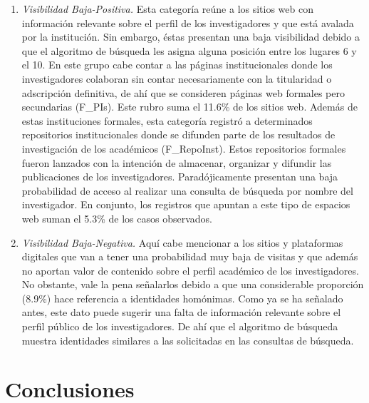 \documentclass[
  spanish,
  11pt,
  a4paper,
]{scrbook}
\begin{document}
\begin{enumerate}
  perfil académico del investigador, alojada en páginas web con
  determinada reputación o seriedad, tiende a restar relevancia para el
  algoritmo de búsqueda, de ahí que la consulta con el nombre propio del
  investigador arroje resultados homónimos. De igual manera, la
  singularidad o popularidad de los apellidos (por ejemplo, un Hernández
  López \emph{versus} un Cetto Kramis) puede considerarse como un factor
  de distinción al momento en que el algoritmo de búsqueda expone la
  relevancia de los resultados.
\item
  \emph{Visibilidad Baja-Positiva.} Esta categoría reúne a los sitios
  web con información relevante sobre el perfil de los investigadores y
  que está avalada por la institución. Sin embargo, éstas presentan una
  baja visibilidad debido a que el algoritmo de búsqueda les asigna
  alguna posición entre los lugares 6 y el 10. En este grupo cabe contar
  a las páginas institucionales donde los investigadores colaboran sin
  contar necesariamente con la titularidad o adscripción definitiva, de
  ahí que se consideren páginas web formales pero secundarias (F\_PIs).
  Este rubro suma el 11.6\% de los sitios web. Además de estas
  instituciones formales, esta categoría registró a determinados
  repositorios institucionales donde se difunden parte de los resultados
  de investigación de los académicos (F\_RepoInst). Estos repositorios
  formales fueron lanzados con la intención de almacenar, organizar y
  difundir las publicaciones de los investigadores. Paradójicamente
  presentan una baja probabilidad de acceso al realizar una consulta de
  búsqueda por nombre del investigador. En conjunto, los registros que
  apuntan a este tipo de espacios web suman el 5.3\% de los casos
  observados.
\item
  \emph{Visibilidad Baja-Negativa.} Aquí cabe mencionar a los sitios y
  plataformas digitales que van a tener una probabilidad muy baja de
  visitas y que además no aportan valor de contenido sobre el perfil
  académico de los investigadores. No obstante, vale la pena señalarlos
  debido a que una considerable proporción (8.9\%) hace referencia a
  identidades homónimas. Como ya se ha señalado antes, este dato puede
  sugerir una falta de información relevante sobre el perfil público de
  los investigadores. De ahí que el algoritmo de búsqueda muestra
  identidades similares a las solicitadas en las consultas de búsqueda.
\end{enumerate}

\section*{Conclusiones}\label{conclusiones}
\end{document}
